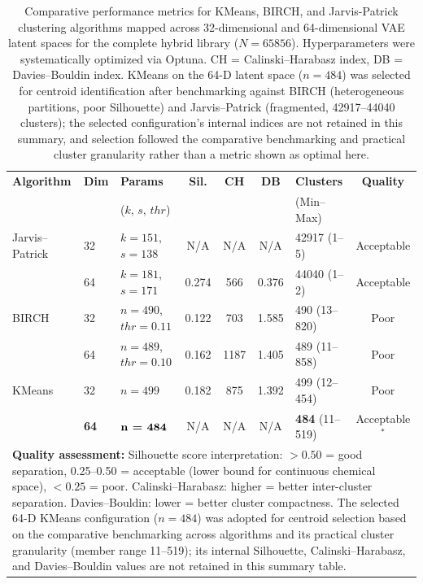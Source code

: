 \documentclass[journal=jcisd8,manuscript=suppinfo]{achemso}
\begin{document}
\begin{table}[!htbp]
\centering
\caption{Comparative performance metrics for KMeans, BIRCH, and Jarvis-Patrick clustering algorithms mapped across \num{32}-dimensional and \num{64}-dimensional VAE latent spaces for the complete hybrid library ($N = \num{65856}$). Hyperparameters were systematically optimized via Optuna. CH = Calinski--Harabasz index, DB = Davies--Bouldin index. KMeans on the \num{64}-D latent space ($n = \num{484}$) was selected for centroid identification after benchmarking against BIRCH (heterogeneous partitions, poor Silhouette) and Jarvis--Patrick (fragmented, \numrange{42917}{44040} clusters); the selected configuration's internal indices are not retained in this summary, and selection followed the comparative benchmarking and practical cluster granularity rather than a metric shown as optimal here.}
\label{tab:clustering_comparison}
\renewcommand{\arraystretch}{1.2}
\small
\begin{tabular}{@{}l l l c c c l c@{}}
\toprule
\textbf{Algorithm} & \textbf{Dim} & \textbf{Params} & \textbf{Sil.} & \textbf{CH} & \textbf{DB} & \textbf{Clusters} & \textbf{Quality} \\
& & ($k$, $s$, $thr$) & & & & (Min--Max) & \\
\midrule
Jarvis--Patrick & \num{32} & $k = \num{151}$, $s = \num{138}$ & N/A & N/A & N/A & \num{42917} (\numrange{1}{5}) & Acceptable \\
& \num{64} & $k = \num{181}$, $s = \num{171}$ & \num{0.274} & \num{566} & \num{0.376} & \num{44040} (\numrange{1}{2}) & Acceptable \\
\midrule
BIRCH & \num{32} & $n = \num{490}$, $thr = \num{0.11}$ & \num{0.122} & \num{703} & \num{1.585} & \num{490} (\numrange{13}{820}) & Poor \\
& \num{64} & $n = \num{489}$, $thr = \num{0.10}$ & \num{0.162} & \num{1187} & \num{1.405} & \num{489} (\numrange{11}{858}) & Poor \\
\midrule
KMeans & \num{32} & $n = \num{499}$ & \num{0.182} & \num{875} & \num{1.392} & \num{499} (\numrange{12}{454}) & Poor \\
& \textbf{\num{64}} & $\textbf{n = \num{484}}$ & N/A & N/A & N/A & \textbf{\num{484}} (\numrange{11}{519}) & Acceptable$^*$ \\
\bottomrule
\multicolumn{8}{p{17cm}}{
\textbf{Quality assessment:} Silhouette score interpretation: $>0.50$ = good separation,
\numrange{0.25}{0.50} = acceptable (lower bound for continuous chemical space), $<0.25$ = poor.
Calinski--Harabasz: higher = better inter-cluster separation.
Davies--Bouldin: lower = better cluster compactness.
The selected \num{64}-D KMeans configuration ($n = \num{484}$) was adopted for centroid selection based on the comparative benchmarking across algorithms and its practical cluster granularity (member range \numrange{11}{519}); its internal Silhouette, Calinski--Harabasz, and Davies--Bouldin values are not retained in this summary table.
}
\end{tabular}
\end{table}
\end{document}
